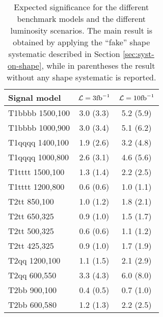\begin{table}
  \centering
  \caption{Expected significance for the different benchmark models and the different luminosity scenarios. 
    The main result is obtained by applying 
  the ``fake'' shape systematic described in Section \ref{sec:syst-on-shape}, while in parentheses the result without any shape systematic is reported.}
  \label{tab:results_signif}
  \footnotesize
  \footnotesize
  \begin{tabular}{lcc}
    \hline
    \hline
    Signal model & $\mathcal{L} = 3 \text{fb}^{-1}$ & $\mathcal{L} = 10 \text{fb}^{-1}$ \\
    \hline
    \hline
    T1bbbb 1500,100  & 3.0 (3.3) & 5.2 (5.9) \\  
    T1bbbb 1000,900  & 3.0 (3.4) & 5.1 (6.2) \\  
    T1qqqq 1400,100  & 1.9 (2.6) & 3.2 (4.8) \\  
    T1qqqq 1000,800  & 2.6 (3.1) & 4.6 (5.6) \\  
    T1tttt 1500,100  & 1.3 (1.4) & 2.2 (2.5) \\  
    T1tttt 1200,800  & 0.6 (0.6) & 1.0 (1.1) \\  \hline
    T2tt 850,100     & 1.0 (1.2) & 1.8 (2.1) \\  
    T2tt 650,325     & 0.9 (1.0) & 1.5 (1.7) \\  
    T2tt 500,325     & 0.6 (0.6) & 1.1 (1.2) \\  
    T2tt 425,325     & 0.9 (1.0) & 1.7 (1.9) \\  
    T2qq 1200,100    & 1.1 (1.5) & 2.1 (2.9) \\  
    T2qq 600,550     & 3.3 (4.3) & 6.0 (8.0) \\  
    T2bb 900,100     & 0.4 (0.5) & 0.7 (1.0) \\  
    T2bb 600,580     & 1.2 (1.3) & 2.2 (2.5) \\  
    \hline
    \hline
  \end{tabular} 
\end{table}


